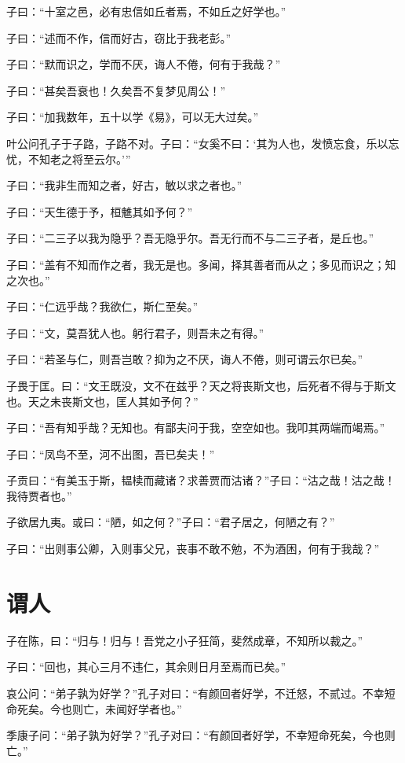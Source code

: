 \documentclass[a5paper]{ctexbook}
\begin{document}
    子曰：“十室之邑，必有忠信如丘者焉，不如丘之好学也。”

    子曰：“述而不作，信而好古，窃比于我老彭。”

    子曰：“默而识之，学而不厌，诲人不倦，何有于我哉？”

    子曰：“甚矣吾衰也！久矣吾不复梦见周公！”

    子曰：“加我数年，五十以学《易》，可以无大过矣。”

    叶公问孔子于子路，子路不对。子曰：“女奚不曰：‘其为人也，发愤忘食，乐以忘忧，不知老之将至云尔。’”

    子曰：“我非生而知之者，好古，敏以求之者也。”

    子曰：“天生德于予，桓魋其如予何？”

    子曰：“二三子以我为隐乎？吾无隐乎尔。吾无行而不与二三子者，是丘也。”

    子曰：“盖有不知而作之者，我无是也。多闻，择其善者而从之；多见而识之；知之次也。”

    子曰：“仁远乎哉？我欲仁，斯仁至矣。”

    子曰：“文，莫吾犹人也。躬行君子，则吾未之有得。”

    子曰：“若圣与仁，则吾岂敢？抑为之不厌，诲人不倦，则可谓云尔已矣。”

    子畏于匡。曰：“文王既没，文不在兹乎？天之将丧斯文也，后死者不得与于斯文也。天之未丧斯文也，匡人其如予何？”

    子曰：“吾有知乎哉？无知也。有鄙夫问于我，空空如也。我叩其两端而竭焉。”

    子曰：“凤鸟不至，河不出图，吾已矣夫！”

    子贡曰：“有美玉于斯，韫椟而藏诸？求善贾而沽诸？”子曰：“沽之哉！沽之哉！我待贾者也。”

    子欲居九夷。或曰：“陋，如之何？”子曰：“君子居之，何陋之有？”

    子曰：“出则事公卿，入则事父兄，丧事不敢不勉，不为酒困，何有于我哉？”

    \chapter{谓人}

    子在陈，曰：“归与！归与！吾党之小子狂简，斐然成章，不知所以裁之。”

    子曰：“回也，其心三月不违仁，其余则日月至焉而已矣。”

    哀公问：“弟子孰为好学？”孔子对曰：“有颜回者好学，不迁怒，不贰过。不幸短命死矣。今也则亡，未闻好学者也。”

    季康子问：“弟子孰为好学？”孔子对曰：“有颜回者好学，不幸短命死矣，今也则亡。”
\end{document}
